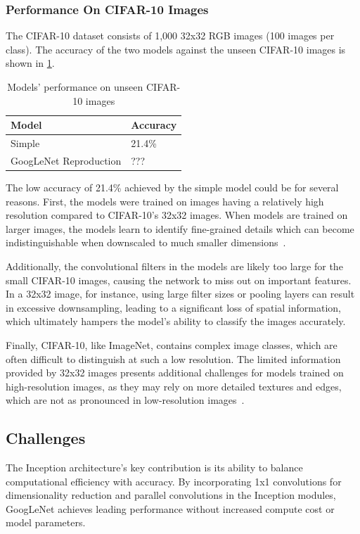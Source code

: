 \documentclass{article}
\begin{document}
\subsubsection{Performance On CIFAR-10 Images}
The CIFAR-10 dataset consists of 1,000 32x32 RGB images (100 images per class). The accuracy of the two models against the unseen CIFAR-10 images is shown in \ref{tab:perf-unseen-imagenet}.

\begin{table}[ht]
    \centering
    \begin{tabular}{ll}
    \hline
    \textbf{Model} & \textbf{Accuracy} \\ \hline
    Simple & 21.4\% \\ \hline
    GoogLeNet Reproduction & ??? \\ \hline
    \end{tabular}
    \caption{Models' performance on unseen CIFAR-10 images}
    \label{tab:perf-unseen-imagenet}
\end{table}

The low accuracy of 21.4\% achieved by the simple model could be for several reasons. First, the models were trained on images having a relatively high resolution compared to CIFAR-10's 32x32 images. When models are trained on larger images, the models learn to identify fine-grained details which can become indistinguishable when downscaled to much smaller dimensions~\cite{simonyan2015vgg}.

Additionally, the convolutional filters in the models are likely too large for the small CIFAR-10 images, causing the network to miss out on important features. In a 32x32 image, for instance, using large filter sizes or pooling layers can result in excessive downsampling, leading to a significant loss of spatial information, which ultimately hampers the model's ability to classify the images accurately.

Finally, CIFAR-10, like ImageNet, contains complex image classes, which are often difficult to distinguish at such a low resolution. The limited information provided by 32x32 images presents additional challenges for models trained on high-resolution images, as they may rely on more detailed textures and edges, which are not as pronounced in low-resolution images~\cite{krizhevsky2012imagenet}.


\subsection{Challenges}
The Inception architecture's key contribution is its ability to balance computational efficiency with accuracy. By incorporating 1x1 convolutions for dimensionality reduction and parallel convolutions in the Inception modules, GoogLeNet achieves leading performance without increased compute cost or model parameters.
\end{document}

